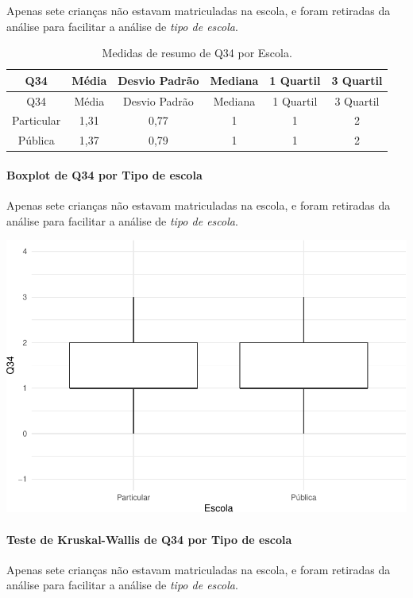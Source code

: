 \documentclass[]{article}
\let\oldparagraph\paragraph
\renewcommand{\paragraph}[1]{\oldparagraph{#1}\mbox{}}
\begin{document}
Apenas sete crianças não estavam matriculadas na escola, e foram retiradas da análise para facilitar a análise de \emph{tipo de escola}.

\begin{longtable}[]{@{}cccccc@{}}
\caption{\label{tab:unnamed-chunk-1237}Medidas de resumo de Q34 por Escola.}\tabularnewline
\toprule
Q34 & Média & Desvio Padrão & Mediana & 1 Quartil & 3 Quartil\tabularnewline
\midrule
\endfirsthead
\toprule
Q34 & Média & Desvio Padrão & Mediana & 1 Quartil & 3 Quartil\tabularnewline
\midrule
\endhead
Particular & 1,31 & 0,77 & 1 & 1 & 2\tabularnewline
Pública & 1,37 & 0,79 & 1 & 1 & 2\tabularnewline
\bottomrule
\end{longtable}

\hypertarget{boxplot-de-q34-por-tipo-de-escola}{%
\paragraph{Boxplot de Q34 por Tipo de escola}\label{boxplot-de-q34-por-tipo-de-escola}}

Apenas sete crianças não estavam matriculadas na escola, e foram retiradas da análise para facilitar a análise de \emph{tipo de escola}.

\begin{center}\includegraphics[width=0.75\linewidth]{relatorio_covid19_files/figure-latex/unnamed-chunk-1238-1} \end{center}

\hypertarget{teste-de-kruskal-wallis-de-q34-por-tipo-de-escola}{%
\paragraph{Teste de Kruskal-Wallis de Q34 por Tipo de escola}\label{teste-de-kruskal-wallis-de-q34-por-tipo-de-escola}}

Apenas sete crianças não estavam matriculadas na escola, e foram retiradas da análise para facilitar a análise de \emph{tipo de escola}.
\end{document}
